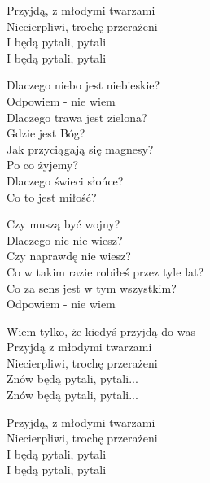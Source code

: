 \begin{text}
    Przyjdą, z młodymi twarzami\\
    Niecierpliwi, trochę przerażeni\\
    I będą pytali, pytali\\
    I będą pytali, pytali

    Dlaczego niebo jest niebieskie?\\
    Odpowiem - nie wiem\\
    Dlaczego trawa jest zielona?\\
    Gdzie jest Bóg?\\
    Jak przyciągają się magnesy?\\
    Po co żyjemy?\\
    Dlaczego świeci słońce?\\
    Co to jest miłość?

    Czy muszą być wojny?\\
    Dlaczego nic nie wiesz?\\
    Czy naprawdę nie wiesz?\\
    Co w takim razie robiłeś przez tyle lat?\\
    Co za sens jest w tym wszystkim?\\
    Odpowiem - nie wiem

    Wiem tylko, że kiedyś przyjdą do was\\
    Przyjdą z młodymi twarzami\\
    Niecierpliwi, trochę przerażeni\\
    Znów będą pytali, pytali...\\
    Znów będą pytali, pytali...

    Przyjdą, z młodymi twarzami\\
    Niecierpliwi, trochę przerażeni\\
    I będą pytali, pytali\\
    I będą pytali, pytali
\end{text}
\begin{chord}

\end{chord}